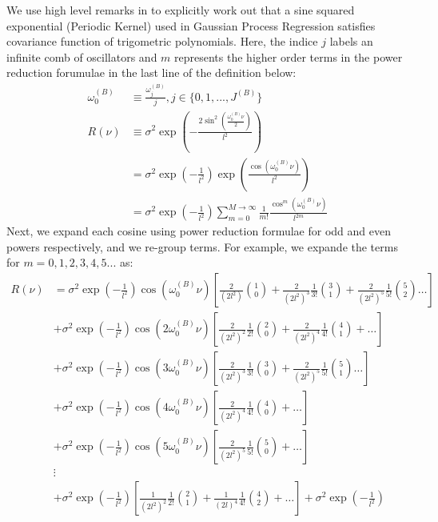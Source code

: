 We use high level remarks in \cite{solin2014explicit} to explicitly work out that a sine squared exponential (Periodic Kernel) used in Gaussian Process Regression satisfies covariance function of trigometric polynomials. Here, the indice $j$ labels an infinite comb of oscillators and $m$ represents the higher order terms in the power reduction forumulae in the last line of the definition below:
\begin{align}
\omega_0^{(B)}  &\equiv \frac{\omega_j^{(B)} }{j}, j \in \{0, 1,..., J^{(B)}\} \\
R(\nu) &\equiv \sigma^2 \exp (- \frac{2\sin^2(\frac{\omega_0^{(B)}  \nu}{2})}{l^2}) \\
&=  \sigma^2 \exp (- \frac{1}{l^2}) \exp (\frac{\cos(\omega_0^{(B)}  \nu)}{l^2}) \label{eqn:periodic_0}\\
&=  \sigma^2 \exp (- \frac{1}{l^2}) \sum_{m = 0}^{M  \to\infty} \frac{1}{m!} \frac{\cos^m(\omega_0^{(B)}  \nu)}{l^{2m}} \label{eqn:periodic_1}
\end{align}
Next, we expand each cosine using power reduction formulae for odd and even powers respectively, and we re-group terms. For example, we expande the terms for  $m = 0,1,2,3,4,5...$ as:
\begin{align}
R(\nu) &= \sigma^2 \exp (- \frac{1}{l^2}) \cos(\omega_0^{(B)}  \nu) \left[ \frac{2}{(2l^2)}\binom{1}{0} + \frac{2}{(2l^2)^3} \frac{1}{3!} \binom{3}{1} +  \frac{2}{(2l^2)^5} \frac{1}{5!}\binom{5}{2} \dots \right] \label{eqn:cosine1}\\
& + \sigma^2 \exp (- \frac{1}{l^2}) \cos(2\omega_0^{(B)}  \nu) \left[ \frac{2}{(2l^2)^2} \frac{1}{2!} \binom{2}{0} + \frac{2}{(2l^2)^4} \frac{1}{4!} \binom{4}{1} + \dots \right] \\
& + \sigma^2 \exp (- \frac{1}{l^2}) \cos(3\omega_0^{(B)}  \nu) \left[ \frac{2}{(2l^2)^3} \frac{1}{3!} \binom{3}{0} + \frac{2}{(2l^2)^5} \frac{1}{5!}\binom{5}{1} \dots \right] \\
& + \sigma^2 \exp (- \frac{1}{l^2}) \cos(4\omega_0^{(B)}  \nu) \left[ \frac{2}{(2l^2)^4} \frac{1}{4!} \binom{4}{0} + \dots \right] \\
& + \sigma^2 \exp (- \frac{1}{l^2}) \cos(5\omega_0^{(B)}  \nu) \left[ \frac{2}{(2l^2)^5} \frac{1}{5!}\binom{5}{0} + \dots \right] \label{eqn:cosine5}\\
& \vdots \nonumber \\
& + \sigma^2 \exp (- \frac{1}{l^2}) \left[ \frac{1}{(2l^2)^2} \frac{1}{2!} \binom{2}{1} + \frac{1}{(2l)^4} \frac{1}{4!} \binom{4}{2} + \dots \right] + \sigma^2 \exp (- \frac{1}{l^2}) \label{eqn:eventerms}
\end{align}
